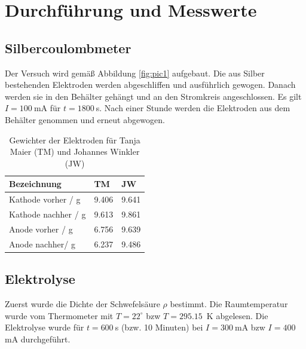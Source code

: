 \documentclass{article}
\begin{document}
\section{Durchführung und Messwerte}

\subsection{Silbercoulombmeter}
Der Versuch wird gemäß Abbildung \ref{fig:pic1} aufgebaut. Die aus Silber bestehenden Elektroden werden abgeschliffen und ausführlich gewogen. Danach werden sie in den Behälter gehängt und an den Stromkreis angeschlossen. Es gilt $I=100~$mA für $t=1800~$s. Nach einer Stunde werden die Elektroden aus dem Behälter genommen und erneut abgewogen.

\begin{table}[H]
\caption{Gewichter der Elektroden für Tanja Maier (TM) und Johannes Winkler (JW)}

\begin{tabular}{l|ll}
Bezeichnung & TM & JW \\
\hline
Kathode vorher / g & 9.406 & 9.641 \\
Kathode nachher / g & 9.613 & 9.861 \\
Anode vorher / g & 6.756 & 9.639  \\
Anode nachher/ g & 6.237 & 9.486 \\
\end{tabular}

\end{table}



\subsection{Elektrolyse}
Zuerst wurde die Dichte der Schwefelsäure $\rho$ bestimmt. Die Raumtemperatur wurde vom Thermometer mit $T=22^\circ$ bzw $T=295.15$~K abgelesen. Die Elektrolyse wurde für $t=600~$s (bzw. 10 Minuten) bei $I=300~$mA bzw $I=400~$mA durchgeführt.
\end{document}
